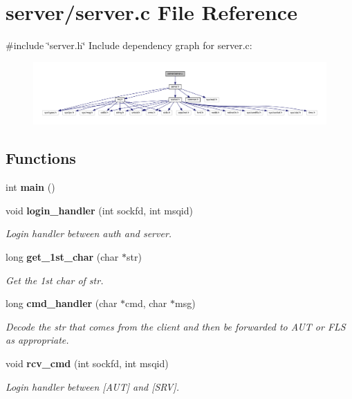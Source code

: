 \section{server/server.c File Reference}
\label{server_8c}
{\ttfamily \#include \char`\"{}server.\+h\char`\"{}}\newline
Include dependency graph for server.\+c\+:
\nopagebreak
\begin{figure}[H]
\begin{center}
\leavevmode
\includegraphics[width=350pt]{server_8c__incl}
\end{center}
\end{figure}
\subsection*{Functions}
\begin{DoxyCompactItemize}
\item 
int \textbf{ main} ()
\item 
void \textbf{ login\+\_\+handler} (int sockfd, int msqid)
\begin{DoxyCompactList}\small\item\em Login handler between auth and server. \end{DoxyCompactList}\item 
long \textbf{ get\+\_\+1st\+\_\+char} (char $\ast$str)
\begin{DoxyCompactList}\small\item\em Get the 1st char of str. \end{DoxyCompactList}\item 
long \textbf{ cmd\+\_\+handler} (char $\ast$cmd, char $\ast$msg)
\begin{DoxyCompactList}\small\item\em Decode the str that comes from the client and then be forwarded to A\+UT or F\+LS as appropriate. \end{DoxyCompactList}\item 
void \textbf{ rcv\+\_\+cmd} (int sockfd, int msqid)
\begin{DoxyCompactList}\small\item\em Login handler between [A\+UT] and [S\+RV]. \end{DoxyCompactList}\end{DoxyCompactItemize}


